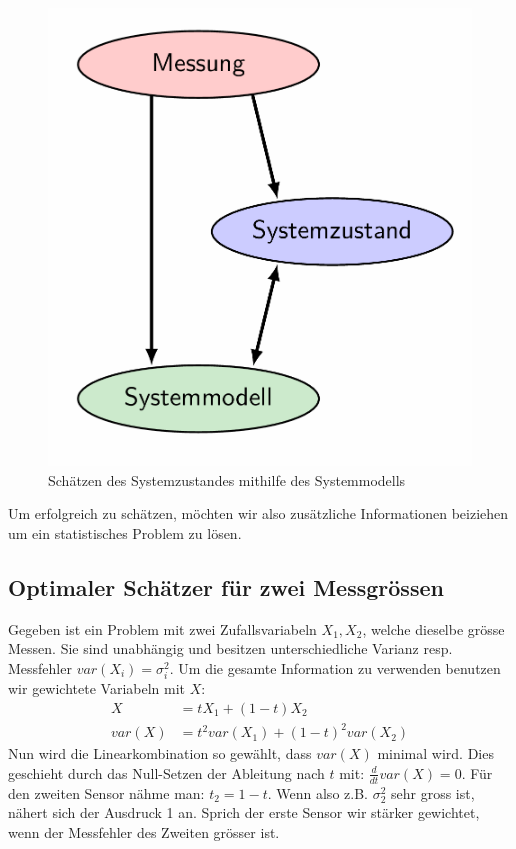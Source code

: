 \documentclass[../Main.tex]{subfiles}
\begin{document}
\begin{figure}[H]
    \centering
    \includegraphics[width=0.25\linewidth]{Images/schaetzen.png}
    \caption{Schätzen des Systemzustandes mithilfe des Systemmodells}
\end{figure}
Um erfolgreich zu schätzen, möchten wir also
zusätzliche Informationen beiziehen um ein
statistisches Problem zu lösen.

\subsection{Optimaler Schätzer für zwei Messgrössen}
Gegeben ist ein Problem mit zwei Zufallsvariabeln
\(X_1,X_2\), welche dieselbe grösse Messen.
Sie sind unabhängig und besitzen unterschiedliche
Varianz resp. Messfehler \(var(X_i)=\sigma_i^2\).
Um die gesamte Information zu verwenden benutzen
wir gewichtete Variabeln mit \(X\):
\begin{equation}
    \begin{split}
        X &= tX_1+(1-t)X_2 \\
        var(X) &= t^2var(X_1) + (1-t)^2var(X_2)
    \end{split}
\end{equation}
Nun wird die Linearkombination so gewählt,
dass \(var(X)\) minimal wird.
Dies geschieht durch das Null-Setzen der Ableitung nach \(t\) mit: \(\frac{d}{dt}var(X)=0\).
Für den zweiten Sensor nähme man: \(t_2 = 1-t\).
Wenn also z.B. \(\sigma_2^2\) sehr gross ist, nähert
sich der Ausdruck 1 an. Sprich der erste Sensor
wir stärker gewichtet, wenn der Messfehler des Zweiten grösser ist.
\end{document}
